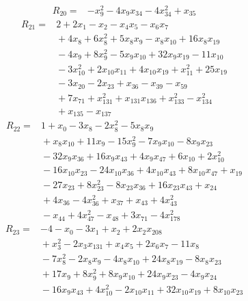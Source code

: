 {\begin{align*}
\end{align*}
\begin{align*}
R_{20} ={}& -x_{9}^{2} - 4x_{9} x_{34} - 4x_{34}^{2} + x_{35}
\end{align*}
\begin{align*}
R_{21} ={}& 2 + 2x_{1} - x_{2} - x_{4} x_{5} - x_{6} x_{7} \\
&{}  + 4x_{8} + 6x_{8}^{2} + 5x_{8} x_{9} - x_{8} x_{10} + 16x_{8} x_{19} \\
&{}  - 4x_{9} + 8x_{9}^{2} - 5x_{9} x_{10} + 32x_{9} x_{19} - 11x_{10} \\
&{}  - 3x_{10}^{2} + 2x_{10} x_{11} + 4x_{10} x_{19} + x_{11}^{2} + 25x_{19} \\
&{}  - 3x_{20} - 2x_{23} + x_{36} - x_{39} - x_{59} \\
&{}  + 7x_{71} + x_{131}^{2} + x_{131} x_{136} + x_{133}^{2} - x_{134}^{2} \\
&{}  + x_{135} - x_{137}
\end{align*}
\begin{align*}
R_{22} ={}& 1 + x_{0} - 3x_{8} - 2x_{8}^{2} - 5x_{8} x_{9} \\
&{}  + x_{8} x_{10} + 11x_{9} - 15x_{9}^{2} - 7x_{9} x_{10} - 8x_{9} x_{23} \\
&{}  - 32x_{9} x_{36} + 16x_{9} x_{43} + 4x_{9} x_{47} + 6x_{10} + 2x_{10}^{2} \\
&{}  - 16x_{10} x_{23} - 24x_{10} x_{36} + 4x_{10} x_{43} + 8x_{10} x_{47} + x_{19} \\
&{}  - 27x_{23} + 8x_{23}^{2} - 8x_{23} x_{36} + 16x_{23} x_{43} + x_{24} \\
&{}  + 4x_{36} - 4x_{36}^{2} + x_{37} + x_{43} + 4x_{43}^{2} \\
&{}  - x_{44} + 4x_{47}^{2} - x_{48} + 3x_{71} - 4x_{178}^{2}
\end{align*}
\begin{align*}
R_{23} ={}& -4 - x_{0} - 3x_{1} + x_{2} + 2x_{2} x_{208} \\
&{}  + x_{3}^{2} - 2x_{3} x_{131} + x_{4} x_{5} + 2x_{6} x_{7} - 11x_{8} \\
&{}  - 7x_{8}^{2} - 2x_{8} x_{9} - 4x_{8} x_{10} + 24x_{8} x_{19} - 8x_{8} x_{23} \\
&{}  + 17x_{9} + 8x_{9}^{2} + 8x_{9} x_{10} + 24x_{9} x_{23} - 4x_{9} x_{24} \\
&{}  - 16x_{9} x_{43} + 4x_{10}^{2} - 2x_{10} x_{11} + 32x_{10} x_{19} + 8x_{10} x_{23} \\

\end{align*}}
